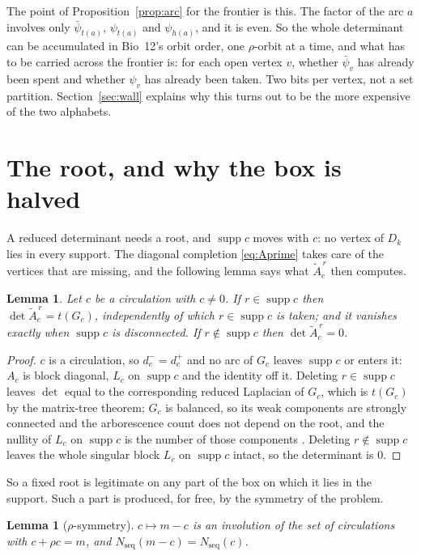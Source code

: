 \documentclass[11pt]{article}
\theoremstyle{plain}
\newtheorem{lemma}[theorem]{Lemma}
\theoremstyle{definition}
\theoremstyle{remark}
\newcommand{\supp}{\operatorname{supp}}
\newcommand{\Nseq}{N_{\mathrm{seq}}}
\newcommand{\bpsi}{\bar\psi}
\begin{document}
The point of Proposition~\ref{prop:arc} for the frontier is this. The factor of the arc $a$
involves only $\bpsi_{t(a)}$, $\psi_{t(a)}$ and $\psi_{h(a)}$, and it is even. So the whole
determinant can be accumulated in Bio~12's orbit order, one $\rho$-orbit at a time, and what has
to be carried across the frontier is: for each open vertex $v$, whether $\bpsi_v$ has already
been spent and whether $\psi_v$ has already been taken. Two bits per vertex, not a set
partition. Section~\ref{sec:wall} explains why this turns out to be the more expensive of the
two alphabets.

\section{The root, and why the box is halved}\label{sec:root}

A reduced determinant needs a root, and $\supp c$ moves with $c$: no vertex of $D_k$ lies in
every support. The diagonal completion \eqref{eq:Aprime} takes care of the vertices that are
missing, and the following lemma says what $\widetilde A^{\,r}_c$ then computes.

\begin{lemma}\label{lem:root}
Let $c$ be a circulation with $c\ne0$. If $r\in\supp c$ then
$\det\widetilde A^{\,r}_c=t(G_c)$, independently of which $r\in\supp c$ is taken; and it
vanishes exactly when $\supp c$ is disconnected. If $r\notin\supp c$ then
$\det\widetilde A^{\,r}_c=0$.
\end{lemma}

\begin{proof}
$c$ is a circulation, so $d^-_c=d^+_c$ and no arc of $G_c$ leaves $\supp c$ or enters it: $A_c$
is block diagonal, $L_c$ on $\supp c$ and the identity off it. Deleting $r\in\supp c$ leaves
$\det$ equal to the corresponding reduced Laplacian of $G_c$, which is $t(G_c)$ by the
matrix-tree theorem; $G_c$ is balanced, so its weak components are strongly connected and the
arborescence count does not depend on the root, and the nullity of $L_c$ on $\supp c$ is the
number of those components \cite[Lemma~3]{Bio12}. Deleting $r\notin\supp c$ leaves the whole
singular block $L_c$ on $\supp c$ intact, so the determinant is $0$.
\end{proof}

So a fixed root is legitimate on any part of the box on which it lies in the support. Such a
part is produced, for free, by the symmetry of the problem.

\begin{lemma}[$\rho$-symmetry]\label{lem:sym}
$c\mapsto m-c$ is an involution of the set of circulations with $c+\rho c=m$, and
$\Nseq(m-c)=\Nseq(c)$.
\end{lemma}
\end{document}
